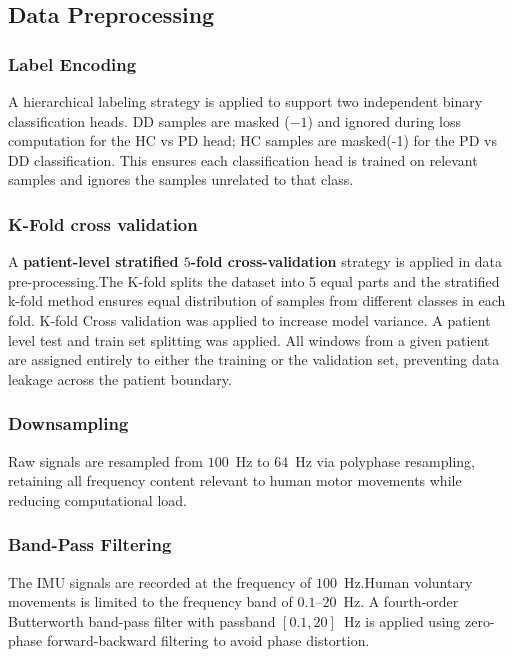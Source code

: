 \documentclass[conference]{IEEEtran}
\begin{document}
\subsection{Data Preprocessing}

\subsubsection{Label Encoding}
A hierarchical labeling strategy is applied to support two independent binary classification heads. DD samples are masked ($-1$) and ignored during loss computation for the HC vs PD head; HC samples are masked(-1) for the PD vs DD classification. This ensures each classification head is trained on relevant samples and ignores the samples unrelated to that class.
\subsubsection{K-Fold cross validation}
A \textbf{patient-level stratified $5$-fold cross-validation} strategy is applied in data pre-processing.The K-fold splits the dataset into 5 equal parts and the stratified k-fold method ensures equal distribution of samples from different classes in each fold. K-fold Cross validation was applied to increase model variance. A patient level test and train set splitting was applied. All windows from a given patient are assigned entirely to either the training or the validation set, preventing data leakage across the patient boundary. 

\subsubsection{Downsampling}
Raw signals are resampled from $100$~Hz to $64$~Hz via polyphase resampling, retaining all frequency content relevant to human motor movements while reducing computational load.

\subsubsection{Band-Pass Filtering}
 The IMU signals are recorded at the frequency of $100$~Hz.Human voluntary movements is limited to the frequency band of $0.1$--$20$~Hz.  A fourth-order Butterworth band-pass filter with passband $[0.1, 20]$~Hz is applied using zero-phase forward-backward filtering to avoid phase distortion. 
\end{document}
